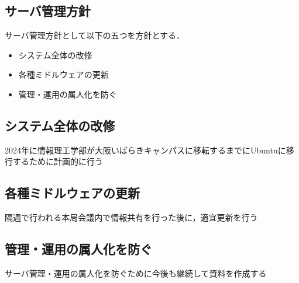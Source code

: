 \subsection*{サーバ管理方針}


サーバ管理方針として以下の五つを方針とする．
\begin{itemize}
    \item システム全体の改修
    \item 各種ミドルウェアの更新
    \item 管理・運用の属人化を防ぐ
\end{itemize}

\subsection*{システム全体の改修}
2024年に情報理工学部が大阪いばらきキャンパスに移転するまでにUbuntuに移行するために計画的に行う

\subsection*{各種ミドルウェアの更新}
隔週で行われる本局会議内で情報共有を行った後に，適宜更新を行う

\subsection*{管理・運用の属人化を防ぐ}
サーバ管理・運用の属人化を防ぐために今後も継続して資料を作成する
